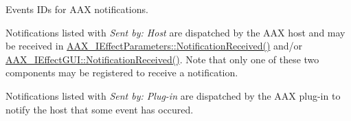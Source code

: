 Events I\+Ds for A\+AX notifications. 


\begin{DoxyItemize}
\item Notifications listed with {\itshape Sent by\+: Host} are dispatched by the A\+AX host and may be received in \mbox{\hyperlink{a01669_aa3eaeb292d2ca84086a5a058171994fd}{A\+A\+X\+\_\+\+I\+Effect\+Parameters\+::\+Notification\+Received()}} and/or \mbox{\hyperlink{a01665_a11a15162cb3c7019d1fabf2994fba6c6}{A\+A\+X\+\_\+\+I\+Effect\+G\+U\+I\+::\+Notification\+Received()}}. Note that only one of these two components may be registered to receive a notification.
\item Notifications listed with {\itshape Sent by\+: Plug-\/in} are dispatched by the A\+AX plug-\/in to notify the host that some event has occured.
\end{DoxyItemize}

